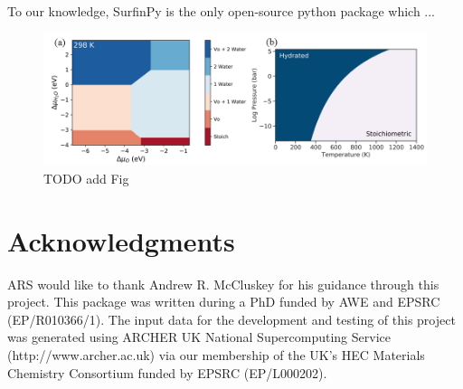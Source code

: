 \documentclass[journal=jacsat,manuscript=article]{achemso}
\begin{document}
To our knowledge, SurfinPy is the only open-source python package which ...


\begin{figure}[!htb]
    \centering\includegraphics[width=6in]{../Figure_1.png}
    \caption{TODO add Fig}
    \label{Figure 1}
  \end{figure}
  
\section{Acknowledgments}

ARS would like to thank Andrew R. McCluskey for his guidance through this project. This package was written during a PhD funded by AWE and EPSRC (EP/R010366/1). The input
data for the development and testing of this project was generated using ARCHER UK National Supercomputing Service (http://www.archer.ac.uk) via our membership of 
the UK's HEC Materials Chemistry Consortium funded by EPSRC (EP/L000202). 


\end{document}
